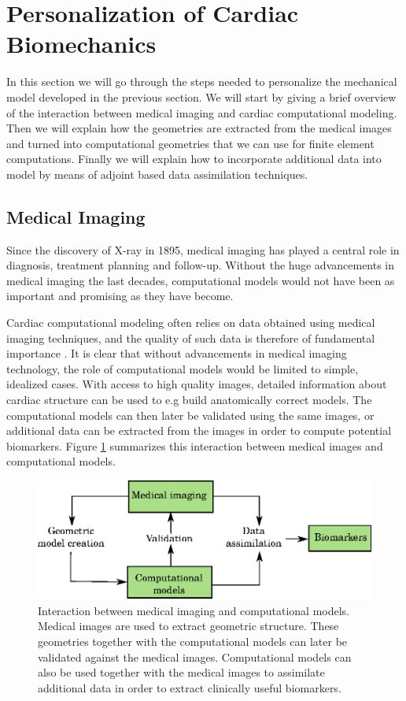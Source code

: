 \section{Personalization of Cardiac Biomechanics}
\label{sec:intro_personalization}
In this section we will go through the steps needed to personalize the
mechanical model developed in the previous section. We will start by
giving a brief overview of the interaction between medical imaging and
cardiac computational modeling. Then we will explain how the geometries
are extracted from the medical images and turned into computational
geometries that we can use for finite element computations. Finally we
will explain how to incorporate additional data into model by means of
adjoint based data assimilation techniques.


\subsection{Medical Imaging}

Since the discovery of X-ray in 1895, medical imaging has played a central
role in diagnosis, treatment planning and follow-up. Without the huge
advancements in medical imaging the last decades, computational models
would not have been as important and promising as they have become.


Cardiac computational modeling often relies on data obtained using
medical imaging techniques, and the quality of such data is therefore of
fundamental importance \cite{lamata2014images}. It is clear that
without advancements in medical imaging technology, the role of
computational models would be limited to simple, idealized cases. With
access to high quality images, detailed information about cardiac structure
can be used to e.g build anatomically correct models. The
computational models can then later be validated using the same
images, or additional data can be extracted from the images in order to
compute potential biomarkers. Figure \ref{fig:cardiac_imaging_model} summarizes
this interaction between medical images and computational models. 

\begin{figure}[htbp]
  \centering
    \includegraphics{chapters/introduction/figures/models.eps}
\caption{Interaction between medical imaging and computational
  models. Medical images are used to extract geometric
  structure. These geometries together with the computational models
  can later be validated against the medical images. Computational
  models can also be used together with the medical images to
  assimilate additional data in order to extract clinically useful
  biomarkers. }
\label{fig:cardiac_imaging_model}
\end{figure}



